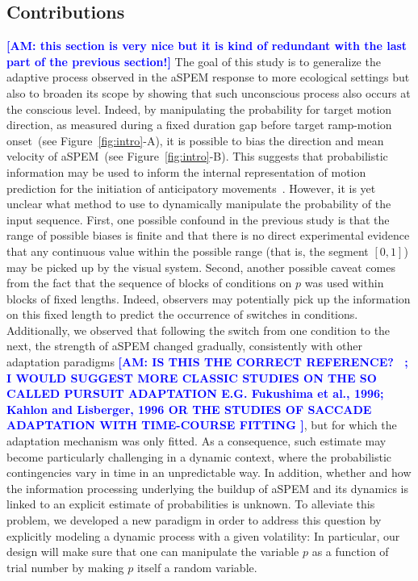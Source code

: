 \documentclass[12pt,english]{article}%
\newcommand{\citep}[1]{\parencite{#1}}
\newcommand{\seeFig}[1]{Figure~\ref{fig:#1}}
\newcommand{\AM}[1]{\textbf{\textcolor{blue}{[AM: #1]}}}
\begin{document}
\subsection{Contributions}%
\AM{this section is very nice but it is kind of redundant with the last part of the previous section!}
The goal of this study is to generalize the adaptive process
observed in the aSPEM response to more ecological settings but
also to broaden its scope by showing that such unconscious process
also occurs at the conscious level.
Indeed, by manipulating the probability for target motion direction,
as measured during a fixed duration gap
before target ramp-motion onset~(see \seeFig{intro}-A),
it is possible to bias the direction and mean velocity of aSPEM~(see \seeFig{intro}-B).
This suggests that probabilistic information may be used
to inform the internal representation of motion prediction
for the initiation of anticipatory movements~\citep{Montagnini2010}.
However, it is yet unclear what method to use
to dynamically manipulate the probability of the input sequence.
First, one possible confound in the previous study
is that the range of possible biases is finite and
that there is no direct experimental evidence that
any continuous value within the possible range (that is, the segment $[ 0, 1 ]$)
may be picked up by the visual system.
Second, another possible caveat comes from the fact that the sequence of blocks of conditions on $p$
was used within blocks of fixed lengths.
Indeed, observers may potentially pick up
the information on this fixed length
to predict the occurrence of switches in conditions.
Additionally, we observed that following the switch from
one condition to the next,
the strength of aSPEM changed gradually,
consistently with other adaptation paradigms \AM{IS THIS THE CORRECT REFERENCE? ~\citep{Souto13}; I WOULD SUGGEST MORE CLASSIC
STUDIES ON THE SO CALLED PURSUIT ADAPTATION E.G. Fukushima et al., 1996; Kahlon and Lisberger, 1996 OR THE STUDIES OF SACCADE ADAPTATION WITH TIME-COURSE FITTING },
but for which the adaptation mechanism was only fitted.
As a consequence, such estimate may become particularly
challenging in a dynamic context,
where the probabilistic contingencies vary in time in an unpredictable way.
In addition, whether and how the information processing underlying
the buildup of aSPEM and its dynamics is linked to
an explicit estimate of probabilities is unknown.
To alleviate this problem, we developed a new paradigm
in order to address this question
by explicitly modeling a dynamic process with a given volatility:
In particular, our design will make sure that one can manipulate the variable $p$
as a function of trial number by making $p$ itself a random variable. %
\end{document}
